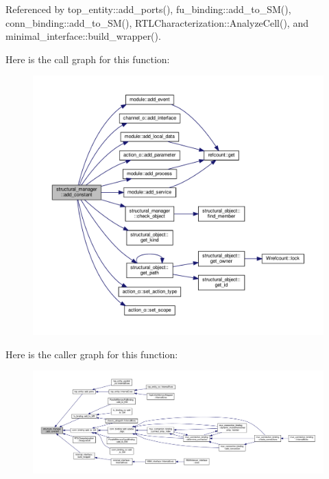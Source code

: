 Referenced by top\+\_\+entity\+::add\+\_\+ports(), fu\+\_\+binding\+::add\+\_\+to\+\_\+\+S\+M(), conn\+\_\+binding\+::add\+\_\+to\+\_\+\+S\+M(), R\+T\+L\+Characterization\+::\+Analyze\+Cell(), and minimal\+\_\+interface\+::build\+\_\+wrapper().

Here is the call graph for this function\+:
\nopagebreak
\begin{figure}[H]
\begin{center}
\leavevmode
\includegraphics[width=350pt]{d7/d6b/classstructural__manager_ae92c4d425e1e86031a2c7379d18d4443_cgraph}
\end{center}
\end{figure}
Here is the caller graph for this function\+:
\nopagebreak
\begin{figure}[H]
\begin{center}
\leavevmode
\includegraphics[width=350pt]{d7/d6b/classstructural__manager_ae92c4d425e1e86031a2c7379d18d4443_icgraph}
\end{center}
\end{figure}
\mbox{\label{classstructural__manager_a5191c94761bf9616a0f19815e2fe1057}} 
